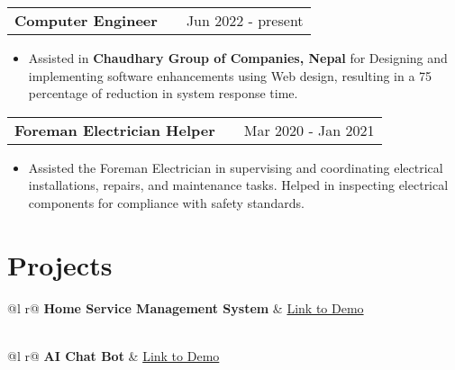 \documentclass[a4paper,12pt]{article}
\makeatletter
\newenvironment{joblong}[2]
    {
    \begin{tabularx}{\linewidth}{@{}l X r@{}}
    \textbf{#1} & \hfill &  #2 \\[3.75pt]
    \end{tabularx}
    \begin{minipage}[t]{\linewidth}
    \begin{itemize}[nosep,after=\strut, leftmargin=1em, itemsep=3pt,label=--]
    }
    {
    \end{itemize}
    \end{minipage}    
    }
\makeatother
\begin{document}
\begin{joblong}{Computer Engineer}{Jun 2022 - present}
\item Assisted in \textbf{Chaudhary Group of Companies, Nepal} for Designing and implementing software enhancements using Web design, resulting in a 75 percentage of reduction in system response time.
\end{joblong}

\begin{joblong}{Foreman Electrician Helper}{Mar 2020 - Jan 2021}
\item Assisted the Foreman Electrician in supervising and coordinating electrical
installations, repairs, and maintenance tasks. Helped in inspecting electrical components for compliance with safety standards.
\end{joblong}
  
\section{Projects}

\begin{tabularx}{\linewidth}{ @{}l r@{} }
\textbf{Home Service Management System} & \hfill \href{https://kajbondu.web.app/}{Link to Demo} \\[3.75pt]
  \\
\end{tabularx}

\begin{tabularx}{\linewidth}{ @{}l r@{} }
\textbf{AI Chat Bot} & \hfill \href{https://jemini-bot.netlify.app/}{Link to Demo} \\[3.75pt]
  \\
\end{tabularx}

\end{document}
